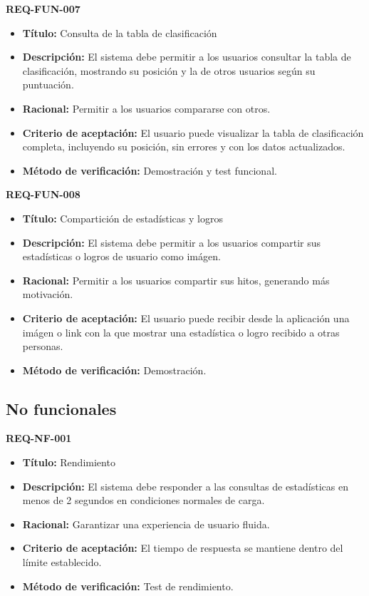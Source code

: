 \textbf{REQ-FUN-007}
\begin{itemize}
    \item \textbf{Título:} Consulta de la tabla de clasificación
    \item \textbf{Descripción:} El sistema debe permitir a los usuarios consultar la tabla de clasificación, mostrando su posición y la de otros usuarios según su puntuación.
    \item \textbf{Racional:} Permitir a los usuarios compararse con otros.
    \item \textbf{Criterio de aceptación:} El usuario puede visualizar la tabla de clasificación completa, incluyendo su posición, sin errores y con los datos actualizados.
    \item \textbf{Método de verificación:} Demostración y test funcional.
\end{itemize}

\textbf{REQ-FUN-008}
\begin{itemize}
    \item \textbf{Título:} Compartición de estadísticas y logros
    \item \textbf{Descripción:} El sistema debe permitir a los usuarios compartir sus estadísticas o logros de usuario como imágen.
    \item \textbf{Racional:} Permitir a los usuarios compartir sus hitos, generando más motivación.
    \item \textbf{Criterio de aceptación:} El usuario puede recibir desde la aplicación una imágen o link con la que mostrar una estadística o logro recibido a otras personas.
    \item \textbf{Método de verificación:} Demostración.
\end{itemize}

\subsection{No funcionales}

\textbf{REQ-NF-001}
\label{req:REQ-NF-001}
\begin{itemize}
    \item \textbf{Título:} Rendimiento
    \item \textbf{Descripción:} El sistema debe responder a las consultas de estadísticas en menos de 2 segundos en condiciones normales de carga.
    \item \textbf{Racional:} Garantizar una experiencia de usuario fluida.
    \item \textbf{Criterio de aceptación:} El tiempo de respuesta se mantiene dentro del límite establecido.
    \item \textbf{Método de verificación:} Test de rendimiento.
\end{itemize}

